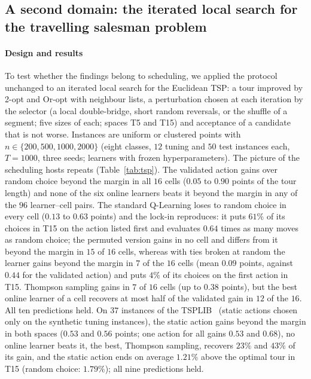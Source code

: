 

\subsection{A second domain: the iterated local search for the travelling salesman problem}
\label{sec:tsp}
\paragraph{Design and results} To test whether the findings belong to scheduling, we applied the protocol unchanged to an iterated local search for the Euclidean TSP: a tour improved by 2-opt and Or-opt with neighbour lists, a perturbation chosen at each iteration by the selector (a local double-bridge, short random reversals, or the shuffle of a segment; five sizes of each; spaces T5 and T15) and acceptance of a candidate that is not worse. Instances are uniform or clustered points with $n\in\{200,500,1000,2000\}$ (eight classes, $12$ tuning and $50$ test instances each, $T=1000$, three seeds; learners with frozen hyperparameters). The picture of the scheduling hosts repeats (Table~\ref{tab:tsp}). The validated action gains over random choice beyond the margin in all $16$ cells ($0.05$ to $0.90$ points of the tour length) and none of the six online learners beats it beyond the margin in any of the $96$ learner--cell pairs. The standard Q-Learning loses to random choice in every cell ($0.13$ to $0.63$ points) and the lock-in reproduces: it puts $61\%$ of its choices in T15 on the action listed first and evaluates $0.64$ times as many moves as random choice; the permuted version gains in no cell and differs from it beyond the margin in $15$ of $16$ cells, whereas with ties broken at random the learner gains beyond the margin in $7$ of the $16$ cells (mean $0.09$ points, against $0.44$ for the validated action) and puts $4\%$ of its choices on the first action in T15. Thompson sampling gains in $7$ of $16$ cells (up to $0.38$ points), but the best online learner of a cell recovers at most half of the validated gain in $12$ of the $16$. All ten predictions held. On $37$ instances of the TSPLIB~\cite{Reinelt1991} (static actions chosen only on the synthetic tuning instances), the static action gains beyond the margin in both spaces ($0.53$ and $0.56$ points; one action for all gains $0.53$ and $0.68$), no online learner beats it, the best, Thompson sampling, recovers $23\%$ and $43\%$ of its gain, and the static action ends on average $1.21\%$ above the optimal tour in T15 (random choice: $1.79\%$); all nine predictions held.

